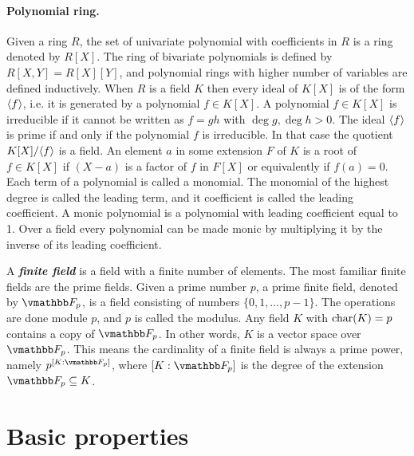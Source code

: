 \paragraph{Polynomial ring.} Given a ring $R$, the set of univariate polynomial with coefficients 
in $R$ is a ring denoted by $R[X]$. The ring of bivariate polynomials is defined by $R[X, Y] = 
R[X][Y]$, and polynomial rings with higher number of variables are defined inductively. When $R$ is 
a field $K$ then every ideal of $K[X]$ is of the form $\langle f\rangle$, i.e. it is generated by a 
polynomial $f \in K[X]$. A polynomial $f \in K[X]$ is irreducible if it cannot be written as $f = 
gh$ with $\deg g, \deg h > 0$. The ideal $\langle f\rangle$ is prime if and only if the polynomial $f$ is 
irreducible. In that case the quotient $K[X] / \langle f\rangle$ is a field. An element $a$ in some 
extension $F$ of $K$ is a root of $f \in K[X]$ if $(X - a)$ is a factor of $f$ in $F[X]$ or 
equivalently if $f(a) = 0$. Each term of a polynomial is called a monomial. The monomial of the 
highest degree is called the leading term, and it coefficient is called the leading coefficient. A 
monic polynomial is a polynomial with leading coefficient equal to 1. Over a field every 
polynomial can be made monic by multiplying it by the inverse of its leading coefficient.
\vspace*{3mm}

A \textbf{\textit{finite field}} is a field with a finite number of elements. The most familiar 
finite fields are the prime fields. Given a prime number $p$, a prime finite field, denoted by 
$\F_p$, is a field consisting of numbers $\{0, 1, \dots, p - 1\}$. The operations are done module 
$p$, and $p$ is called the modulus. Any field $K$ with $\operatorname{char}(K) = p$ contains a copy of 
$\F_p$. In other words, $K$ is a vector space over $\F_p$. This means the cardinality of a finite 
field is always a prime power, namely $p^{[K: \F_p]}$, where $[K: \F_p]$ is the degree of the 
extension $\F_p \subseteq K$.


\section{Basic properties}

